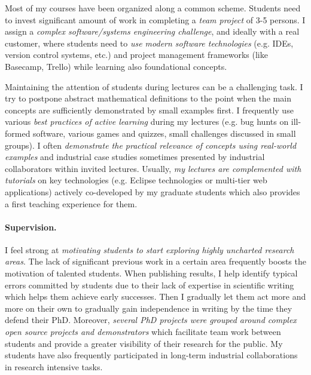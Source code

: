 \documentclass[a4paper,11pt]{article}
\begin{document}
Most of my courses have been organized along a common scheme. Students need to invest significant amount of work in completing a \emph{team project} of 3-5 persons. I assign a \emph{complex software/systems engineering challenge}, and ideally with a real customer, where students need to \emph{use modern software technologies} (e.g. IDEs, version control systems, etc.) and project management frameworks (like Basecamp, Trello) while learning also foundational concepts. 

Maintaining the attention of students during lectures can be a challenging task. I try to postpone abstract mathematical definitions to the point when the main concepts are sufficiently demonstrated by small examples first. I frequently use various \emph{best practices of active learning} during my lectures (e.g. bug hunts on ill-formed software, various games and quizzes, small challenges discussed in small groups). I often \emph{demonstrate the practical relevance of concepts using real-world examples} and industrial case studies sometimes presented by industrial collaborators within invited lectures. Usually, \emph{my lectures are complemented with tutorials} on key technologies (e.g. Eclipse technologies or multi-tier web applications) actively co-developed by my graduate students which also provides a first teaching experience for them. 

\paragraph{Supervision.} 
I feel strong at \emph{motivating students to start exploring highly uncharted research areas}. The lack of significant previous work in a certain area frequently boosts the motivation of talented students. When publishing results, I help identify typical errors committed by students due to their lack of expertise in scientific writing which helps them achieve early successes. Then I gradually let them act more and more on their own to gradually gain independence in writing by the time they defend their PhD. Moreover, \emph{several PhD projects were grouped around complex open source projects and demonstrators} which facilitate team work between students and provide a greater visibility of their research for the public. My students have also frequently participated in long-term industrial collaborations in research intensive tasks.


\end{document}

